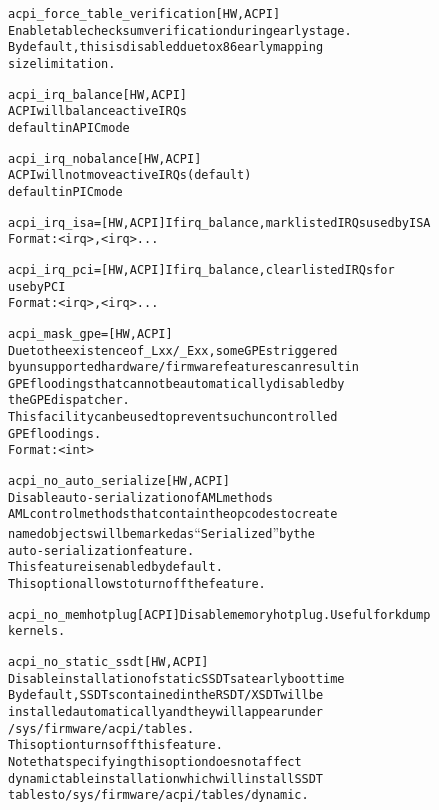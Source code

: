 \documentclass[a4paper,8pt,english]{sphinxmanual}
\begin{document}
\begin{alltt}
        acpi\_force\_table\_verification   {[}HW,ACPI{]}
                        Enable table checksum verification during early stage.
                        By default, this is disabled due to x86 early mapping
                        size limitation.

        acpi\_irq\_balance {[}HW,ACPI{]}
                        ACPI will balance active IRQs
                        default in APIC mode

        acpi\_irq\_nobalance {[}HW,ACPI{]}
                        ACPI will not move active IRQs (default)
                        default in PIC mode

        acpi\_irq\_isa=   {[}HW,ACPI{]} If irq\_balance, mark listed IRQs used by ISA
                        Format: \textless{}irq\textgreater{},\textless{}irq\textgreater{}...

        acpi\_irq\_pci=   {[}HW,ACPI{]} If irq\_balance, clear listed IRQs for
                        use by PCI
                        Format: \textless{}irq\textgreater{},\textless{}irq\textgreater{}...

        acpi\_mask\_gpe=  {[}HW,ACPI{]}
                        Due to the existence of \_Lxx/\_Exx, some GPEs triggered
                        by unsupported hardware/firmware features can result in
                        GPE floodings that cannot be automatically disabled by
                        the GPE dispatcher.
                        This facility can be used to prevent such uncontrolled
                        GPE floodings.
                        Format: \textless{}int\textgreater{}

        acpi\_no\_auto\_serialize  {[}HW,ACPI{]}
                        Disable auto-serialization of AML methods
                        AML control methods that contain the opcodes to create
                        named objects will be marked as ``Serialized'' by the
                        auto-serialization feature.
                        This feature is enabled by default.
                        This option allows to turn off the feature.

        acpi\_no\_memhotplug {[}ACPI{]} Disable memory hotplug.  Useful for kdump
                           kernels.

        acpi\_no\_static\_ssdt     {[}HW,ACPI{]}
                        Disable installation of static SSDTs at early boot time
                        By default, SSDTs contained in the RSDT/XSDT will be
                        installed automatically and they will appear under
                        /sys/firmware/acpi/tables.
                        This option turns off this feature.
                        Note that specifying this option does not affect
                        dynamic table installation which will install SSDT
                        tables to /sys/firmware/acpi/tables/dynamic.


\end{alltt}
\end{document}
